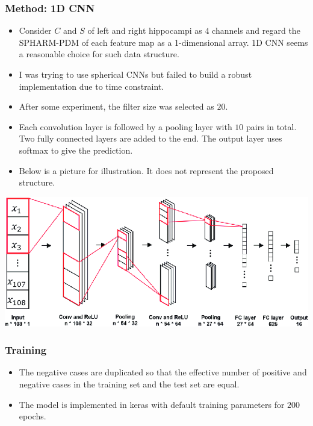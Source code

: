 \documentclass{beamer}
\begin{document}
\begin{frame}
\frametitle{Method: 1D CNN}
\scriptsize{
\begin{itemize}
    \item Consider $C$ and $S$ of left and right hippocampi as $4$ channels and regard the SPHARM-PDM of each feature map as a 1-dimensional array. 1D CNN seems a reasonable choice for such data structure.
    \item I was trying to use spherical CNNs but failed to build a robust implementation due to time constraint.
    \item After some experiment, the filter size was selected as $20$.
    \item Each convolution layer is followed by a pooling layer with $10$ pairs in total. Two fully connected layers are added to the end. The output layer uses softmax to give the prediction.
    \item Below is a picture for illustration. It does not represent the proposed structure.
\end{itemize}
}
\centering
\includegraphics[width=0.8\linewidth]{1Dconv.png}
\end{frame}

\begin{frame}
\frametitle{Training}
\begin{itemize}
    \item The negative cases are duplicated so that the effective number of positive and negative cases in the training set and the test set are equal.
    \item The model is implemented in keras with default training parameters for $200$ epochs.
\end{itemize}
\end{frame}
\end{document}
